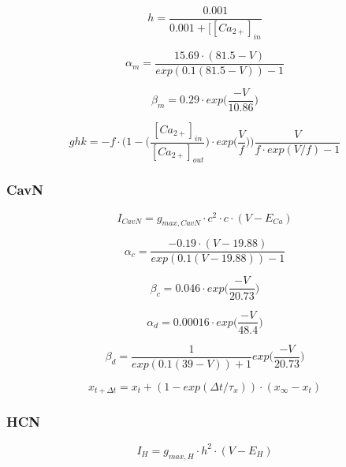 \documentclass[12pt]{article}
\begin{document}
\begin{equation}
h = \frac{0.001}{0.001 +[[Ca_{2+}]_{in} }
\end{equation}

\begin{equation}
\alpha_{m} = \frac{15.69 \cdot (81.5-V)}{exp(0.1(81.5-V)) - 1}
\end{equation}

\begin{equation}
\beta_{m} = 0.29 \cdot exp \Big(\frac{-V}{10.86}\Big)
\end{equation}

\begin{equation}
ghk = -f \cdot \Big(1 - \Big(\frac{[Ca_{2+}]_{in}}{[Ca_{2+}]_{out}} \Big) \cdot exp \Big(\frac{V}{f}\Big) \Big) \frac{V}{f \cdot exp(V/f) -1 }
\end{equation}

\subsubsection{CavN}
\begin{equation}
I_{CavN} = g_{max, CavN} \cdot c^2 \cdot c \cdot (V - E_{Ca})
\end{equation}

\begin{equation}
\alpha_{c} = \frac{-0.19 \cdot (V - 19.88)}{exp(0.1(V - 19.88)) - 1}
\end{equation}

\begin{equation}
\beta_{c} = 0.046 \cdot exp \Big(\frac{-V}{20.73}\Big)
\end{equation}

\begin{equation}
\alpha_{d} = 0.00016 \cdot exp \Big(\frac{-V}{48.4}\Big)
\end{equation}

\begin{equation}
\beta_{d} = \frac{1}{exp(0.1(39 - V)) + 1} exp \Big(\frac{-V}{20.73}\Big)
\end{equation}


\begin{equation}
x_{t+\Delta t} = x_{t} + (1 - exp(\Delta t / \tau_x)  ) \cdot (x_{\infty} - x_t)
\end{equation}

\subsubsection{HCN}
\begin{equation}
I_{H} = g_{max, H} \cdot h^2 \cdot (V - E_{H})
\end{equation}
\end{document}

